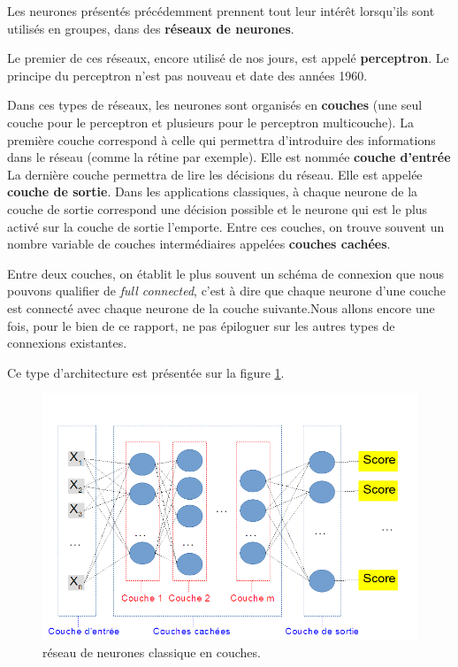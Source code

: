 Les neurones présentés précédemment prennent tout leur intérêt lorsqu'ils sont utilisés en groupes, dans des \textbf{réseaux de neurones}.

Le premier de ces réseaux, encore utilisé de nos jours, est appelé \textbf{perceptron}.
Le principe du perceptron n'est pas nouveau et date des années 1960.

Dans ces types de réseaux, les neurones sont organisés en \textbf{couches} (une seul couche pour le perceptron et plusieurs pour le perceptron multicouche).
La première couche correspond à celle qui permettra d'introduire des informations dans le réseau (comme la rétine par exemple). Elle est nommée \textbf{couche d'entrée}
La dernière couche permettra de lire les décisions du réseau. Elle est appelée \textbf{couche de sortie}. Dans les applications classiques, à chaque neurone de la couche de sortie correspond une décision possible et le neurone qui est le plus activé sur la couche de sortie l'emporte.
Entre ces couches, on trouve souvent un nombre variable de couches intermédiaires appelées \textbf{couches cachées}.

Entre deux couches, on établit le plus souvent un schéma de connexion que nous pouvons qualifier de \textit{full connected}, c'est à dire que chaque neurone d'une couche est connecté avec chaque neurone de la couche suivante.Nous allons encore une fois, pour le bien de ce rapport, ne pas épiloguer sur les autres types de connexions existantes.\newline

Ce type d'architecture est présentée sur la figure \ref{reseauClassique}.

\begin{figure}[h]
\includegraphics[width=16.5cm]{./images/multicouche.png}
\caption{réseau de neurones classique en couches.%
\label{reseauClassique}}
\end{figure}


